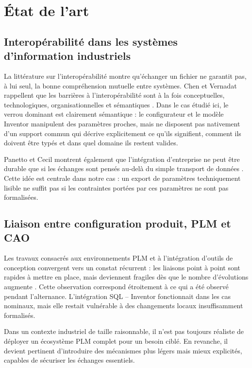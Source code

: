 \section{État de l'art}

\subsection{Interopérabilité dans les systèmes d'information industriels}

La littérature sur l'interopérabilité montre qu'échanger un fichier ne garantit pas, à lui seul, la bonne compréhension mutuelle entre systèmes. Chen et Vernadat rappellent que les barrières à l'interopérabilité sont à la fois conceptuelles, technologiques, organisationnelles et sémantiques \cite{chen2004}. Dans le cas étudié ici, le verrou dominant est clairement sémantique : le configurateur et le modèle Inventor manipulent des paramètres proches, mais ne disposent pas nativement d'un support commun qui décrive explicitement ce qu'ils signifient, comment ils doivent être typés et dans quel domaine ils restent valides.

Panetto et Cecil montrent également que l'intégration d'entreprise ne peut être durable que si les échanges sont pensés au-delà du simple transport de données \cite{panetto2013}. Cette idée est centrale dans notre cas : un export de paramètres techniquement lisible ne suffit pas si les contraintes portées par ces paramètres ne sont pas formalisées.

\subsection{Liaison entre configuration produit, PLM et CAO}

Les travaux consacrés aux environnements PLM et à l'intégration d'outils de conception convergent vers un constat récurrent : les liaisons point à point sont rapides à mettre en place, mais deviennent fragiles dès que le nombre d'évolutions augmente \cite{chen2004}. Cette observation correspond étroitement à ce qui a été observé pendant l'alternance. L'intégration SQL -- Inventor fonctionnait dans les cas nominaux, mais elle restait vulnérable à des changements locaux insuffisamment formalisés.

Dans un contexte industriel de taille raisonnable, il n'est pas toujours réaliste de déployer un écosystème PLM complet pour un besoin ciblé. En revanche, il devient pertinent d'introduire des mécanismes plus légers mais mieux explicités, capables de sécuriser les échanges essentiels.

